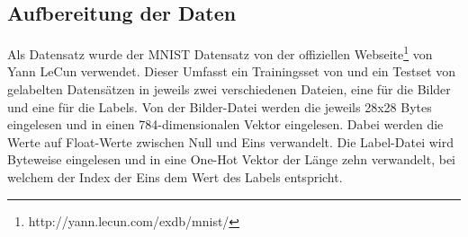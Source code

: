 \documentclass[Interploate_hadwritten_Digits.tex.tex]{subfiles}
\begin{document}
	\subsection{Aufbereitung der Daten}
	Als Datensatz wurde der MNIST Datensatz von der offiziellen Webseite\footnote{ http://yann.lecun.com/exdb/mnist/} von Yann LeCun verwendet. Dieser Umfasst ein Trainingsset von  und ein Testset von  gelabelten Datensätzen in jeweils zwei verschiedenen Dateien, eine für die Bilder und eine für die Labels. Von der Bilder-Datei werden die jeweils 28x28 Bytes eingelesen und in einen 784-dimensionalen Vektor eingelesen. Dabei werden die Werte auf Float-Werte zwischen Null und Eins verwandelt. Die Label-Datei wird Byteweise eingelesen und in eine One-Hot Vektor der Länge zehn verwandelt, bei welchem der Index der Eins dem Wert des Labels entspricht. 
	
\end{document}
